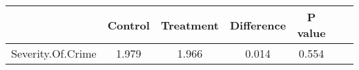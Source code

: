 \begin{tabular}{l*{6}{c}}
                    &     Control&   Treatment&  Difference   &     P value\\
\hline
Severity.Of.Crime   &       1.979&       1.966&       0.014   &       0.554\\
\end{tabular}
